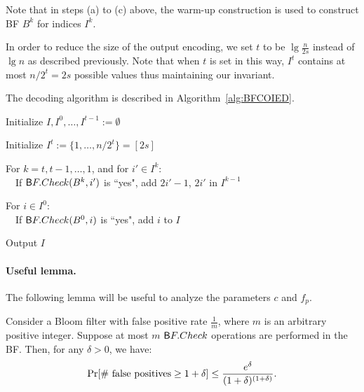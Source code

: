 Note that in steps (a) to (c) above, the warm-up construction is used to
construct BF $B^k$ for indices $I^k$. 

In order to reduce the size of the output encoding, we set $t$ to be
$\lg {\frac n {2s}}$ instead of $\lg n$ as described previously. Note
that when $t$ is set in this way, $I^t$ contains at most $n/2^t = 2s$
possible values thus maintaining our invariant.



The decoding algorithm is described in Algorithm~\ref{alg:BFCOIED}.   

\begin{algorithm}[htbp]
\BEN
\item Initialize $I, I^0, \ldots, I^{t-1} := \emptyset$
\item Initialize $I^t := \{1, \ldots, n/2^t\} = [2s]$
\item For $k = t, t-1, \ldots, 1$, and for $i' \in I^k$: \\
  $~~~$ If ${\sf BF.Check}(B^k, i')$ is ``yes", add $2i'-1$, $2i'$ in $I^{k-1}$  
\item For $i \in I^0$: \\
  $~~~$ If ${\sf BF.Check}(B^0, i)$ is ``yes", add $i$ to $I$  
\item Output $I$ 
\EEN
\caption{ ${\sf BF\mbox{-}COIE}.\Decode(B^0, \ldots, B^t)$} 
\label{alg:BFCOIED}
\end{algorithm}

\paragraph{Useful lemma.}
The following lemma will be useful to analyze the parameters $c$ and
$f_p$.

\begin{lemma}\label{lem:4_1}
Consider a Bloom filter with false positive rate $\frac{1}{m}$, where
$m$ is an arbitrary positive integer. Suppose at most $m$ $\sf BF.Check$ operations
are performed in the BF.
%
Then, for any $\delta > 0$, we have:
$$\Pr [ \mbox{\rm \# false positives} \ge 1+\delta] 
  \le {\frac {e^\delta} {(1+\delta)^{(1+\delta)}}}.$$ 
\end{lemma}

